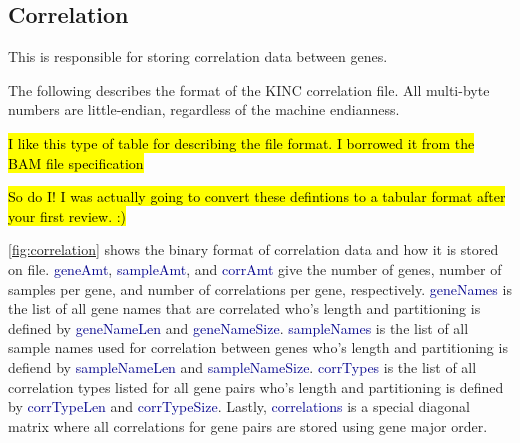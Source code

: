\documentclass[10pt]{article}
\providecommand{\stephen}[1]{\sethlcolor{lyellow}\hl{#1}}
\providecommand{\josh}[1]{\sethlcolor{lblue}\hl{#1}}
\providecommand{\h}[1]{\textcolor{darkblue}{#1}}
\begin{document}
\begin{appendices}
\subsection{Correlation}

This is responsible for storing correlation data between genes.

The following describes the format of the KINC correlation file. All 
multi-byte numbers are little-endian, regardless of the machine endianness.

\stephen{I like this type of table for describing the file format. I borrowed 
it from the BAM file specification}

\josh{So do I! I was actually going to convert these defintions to a tabular 
format after your first review. :)}

\autoref{fig:correlation} shows the binary format of correlation data and how 
it is stored on file. \h{geneAmt}, \h{sampleAmt}, and \h{corrAmt} give the 
number of genes, number of samples per gene, and number of correlations per 
gene, respectively. \h{geneNames} is the list of all gene names that are 
correlated who's length and partitioning is defined by \h{geneNameLen} and 
\h{geneNameSize}. \h{sampleNames} is the list of all sample names used for 
correlation between genes who's length and partitioning is defiend by 
\h{sampleNameLen} and \h{sampleNameSize}. \h{corrTypes} is the list of all 
correlation types listed for all gene pairs who's length and partitioning is 
defined by \h{corrTypeLen} and \h{corrTypeSize}. Lastly, \h{correlations} is a 
special diagonal matrix where all correlations for gene pairs are stored using 
gene major order.


\end{appendices}
\end{document}
